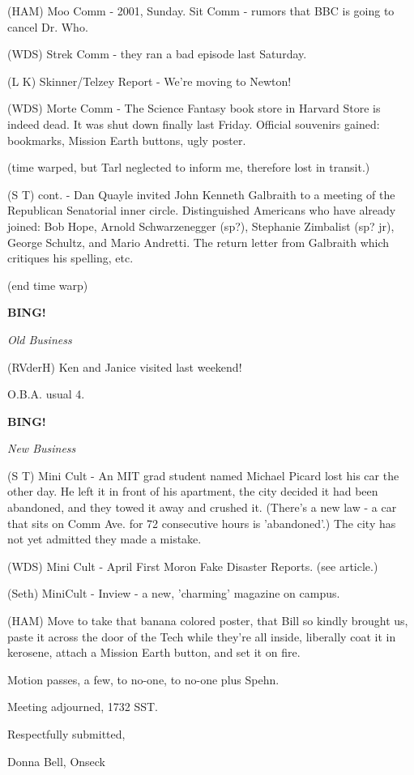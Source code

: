 \documentclass[12pt]{article}
\newcommand{\bing}{{\bf BING!} }
\newcommand{\goto}[1]{\bing \vskip 12pt \centerline{{\em{#1}}}}
\begin{document}
(HAM) Moo Comm - 2001, Sunday. Sit Comm - rumors that BBC is going to cancel Dr. Who.

(WDS) Strek Comm - they ran a bad episode last Saturday.

(L K) Skinner/Telzey Report - We're moving to Newton!

(WDS) Morte Comm - The Science Fantasy book store in Harvard Store is indeed dead. It was shut down finally last Friday. Official souvenirs gained: bookmarks, Mission Earth buttons, ugly poster.

(time warped, but Tarl neglected to inform me, therefore lost in transit.)

(S T) cont. - Dan Quayle invited John Kenneth Galbraith to a meeting of the Republican Senatorial inner circle. Distinguished Americans who have already joined: Bob Hope, Arnold Schwarzenegger (sp?), Stephanie Zimbalist (sp? jr), George Schultz, and Mario Andretti. The return letter from Galbraith which critiques his spelling, etc.

(end time warp)

\goto{Old Business}

(RVderH) Ken and Janice visited last weekend!

O.B.A. usual 4.

\goto{New Business}

(S T) Mini Cult - An MIT grad student named Michael Picard lost his car the other day.  He left it in front of his apartment, the city decided it had been abandoned, and they towed it away and crushed it. (There's a new law - a car that sits on Comm Ave. for 72 consecutive hours is 'abandoned'.) The city has not yet admitted they made a mistake.

(WDS) Mini Cult - April First Moron Fake Disaster Reports. (see article.)

(Seth) MiniCult - Inview - a new, 'charming' magazine on campus.

(HAM) Move to take that banana colored poster, that Bill so kindly brought us, paste it across the door of the Tech while they're all inside, liberally coat it in kerosene, attach a Mission Earth button, and set it on fire.

Motion passes, a few, to no-one, to no-one plus Spehn.

\vspace{12pt}

\noindent
Meeting adjourned, 1732 SST.

\vspace{18pt}

\centerline{Respectfully submitted,}
\centerline{Donna Bell, Onseck}
\end{document}
